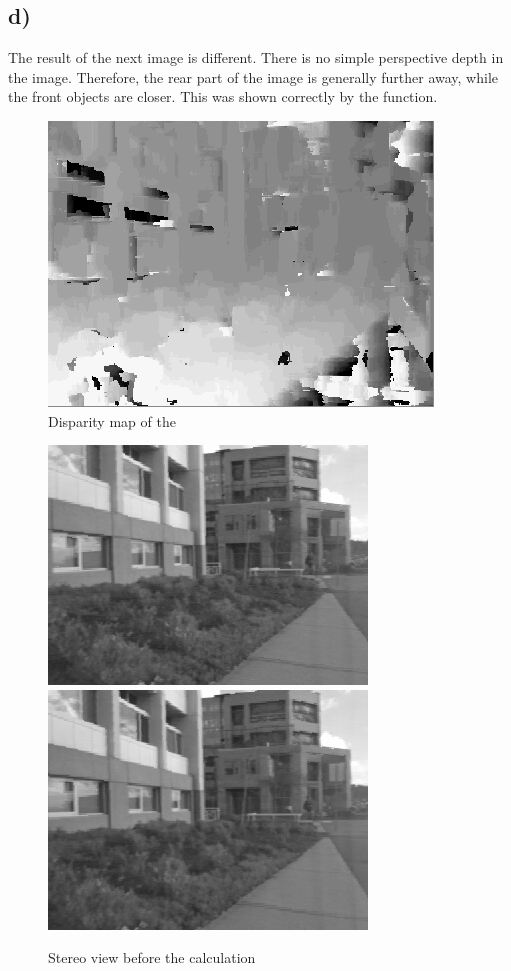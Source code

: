 \documentclass{article}
\begin{document}
	\subsection{d)}
	The result of the next image is different. There is no simple perspective depth in the image. Therefore, the rear part of the image is generally further away, while the front objects are closer. This was shown correctly by the function.
	\begin{figure}
		\center
		\caption{Disparity map of the }
		\includegraphics{triclopsi_disp.png}
	\end{figure}
		\begin{figure}
		\center
		\caption{Stereo view before the calculation}
		\includegraphics[scale=0.4]{triclopsi2l.jpg}
		\includegraphics[scale=0.4]{triclopsi2r.jpg}
	\end{figure}
	
\end{document}
